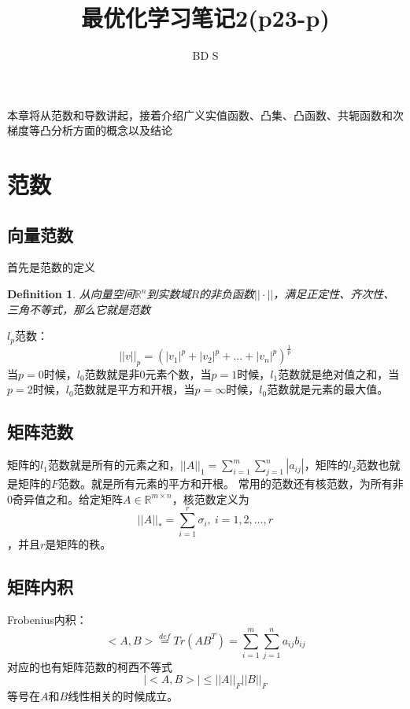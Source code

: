 \documentclass{article}
\title{最优化学习笔记2(p23-p)}
\author{BD S}
\begin{document}
\maketitle
\tableofcontents


\newpage
本章将从范数和导数讲起，接着介绍广义实值函数、凸集、凸函数、共轭函数和次梯度等凸分析方面的概念以及结论
\section{范数}
\subsection{向量范数}

首先是范数的定义
\newtheorem{definition}{Definition}
\begin{definition}
    从向量空间$\mathbb{R}^n$到实数域$R$的非负函数$||\cdot||$，满足正定性、齐次性、三角不等式，那么它就是范数
\end{definition}

$l_p$范数：$$||v||_p=(|v_1|^p+|v_2|^p+...+|v_n|^p)^{\frac{1}{p}}$$
当$p=0$时候，$l_0$范数就是非0元素个数，当$p=1$时候，$l_1$范数就是绝对值之和，当$p=2$时候，$l_0$范数就是平方和开根，当$p=\infty$时候，$l_0$范数就是元素的最大值。
\subsection{矩阵范数}
矩阵的$l_1$范数就是所有的元素之和，$||A||_1=\sum\limits_{i=1}^m\sum\limits_{j=1}^n|a_{ij}|$，矩阵的$l_2$范数也就是矩阵的$F$范数。就是所有元素的平方和开根。
常用的范数还有核范数，为所有非0奇异值之和。给定矩阵$A \in \mathbb{R}^{m \times n}$，核范数定义为$$||A||_*=\sum\limits_{i=1}^r \sigma_i,\ i=1,2,\dots,r $$，并且$r$是矩阵的秩。
\subsection{矩阵内积}
Frobenius内积：$$<A,B>\overset{def}{=}Tr(AB^T)=\sum\limits_{i=1}^m\sum\limits_{j=1}^na_{ij}b_{ij}$$对应的也有矩阵范数的柯西不等式$$|<A,B>| \le ||A||_F ||B||_F$$等号在$A$和$B$线性相关的时候成立。
\end{document}
